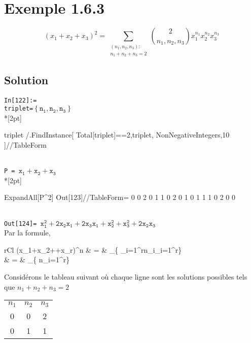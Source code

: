 \section*{Exemple 1.6.3}
\begin{equation*}
	(x_1+x_2+x_3)^2  = \sum_{\substack{(n_1,n_2,n_3):\\n_1+n_2+n_3=2}}%
	\binom{2}{n_1,n_2,n_3}x_1^{n_1} x_2^{n_2} x_3^{n_3}
\end{equation*}
\subsection*{Solution}
\begin{multicols}{2}
\noindent%
\texttt{In[122]:=}\\
\quad\texttt{triplet=$\mathtt{ \left\{n_1,n_2,n_3\right\} }$}\\*[2pt]
\begin{verbbox}
    triplet /.FindInstance[
              Total[triplet]==2,triplet,
              NonNegativeIntegers,10
              ]//TableForm
\end{verbbox}
\theverbbox\\
    \texttt{P = $\mathtt{x_1+x_2+x_3}$}\\*[2pt]
\begin{verbbox}
ExpandAll[P^2]
Out[123]//TableForm=
0	0	2
0	1	1
0	2	0
1	0	1
1	1	0
2	0	0
\end{verbbox}
\theverbbox\\
\texttt{Out[124]= $\mathtt{x_1^2+2 x_2 x_1+2 x_3 x_1+x_2^2+x_3^2+2 x_2 x_3}$}
	\columnbreak\\
	Par la formule,
	\begin{IEEEeqnarray*}{rCl}	
		 (x_1+x_2+\cdots+x_r)^n & = &	\sum_{}\left\{%
		 									\sum_{i=1}^{r}n_i\cdot\prod_{i=1}^{r}\right\}\\
		 						& = &	\sum_{}\left\{%
		 									n\cdot\prod_{i=1}^{r}\right\}	 									
	\end{IEEEeqnarray*}
	Considérons le tableau suivant où chaque ligne sont les solutions possibles tels que $n_1+n_2+n_3=2$
	\begin{center}\begin{tabular}{ccc}
			$n_1$&$n_2$&$n_3$\\
			0 & 0 & 2 \\
			0 & 1 & 1 \\

\end{tabular}
\end{center}
\end{multicols}
